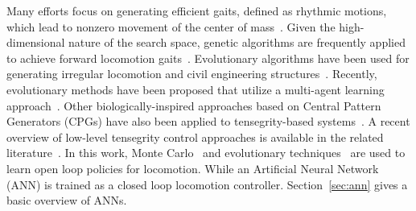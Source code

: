 Many efforts focus on generating efficient gaits, defined as rhythmic
motions, which lead to nonzero movement of the center of
mass~\cite{McIsaac:2003kl}.  Given the high-dimensional nature of the
search space, genetic algorithms are frequently applied to achieve
forward locomotion gaits~\cite{Paul2006a}. Evolutionary algorithms
have been used for generating irregular locomotion and civil
engineering structures~\cite{Rieffel2009Automated-Disco,
veuve2015deployment}. Recently, evolutionary methods have been
proposed that utilize a multi-agent learning
approach~\cite{Iscen2013Controlling-Ten}.  Other biologically-inspired
approaches based on Central Pattern Generators (CPGs) have also
been applied to tensegrity-based
systems~\cite{Bliss2013Central-Pattern, MirletzSoftRobotics,
Caluwaerts2013rsif}. 
A recent overview of low-level tensegrity
control approaches is available in the related literature~\cite[Table
2]{Caluwaerts2013rsif}. 
In this work, Monte Carlo~\cite{doucet2001introduction} and evolutionary techniques~\cite{wiegand2001empirical} are used to learn open loop policies for locomotion.
While an Artificial Neural Network (ANN) is trained as a closed loop locomotion controller.
Section~\ref{sec:ann} gives a basic overview of ANNs.




